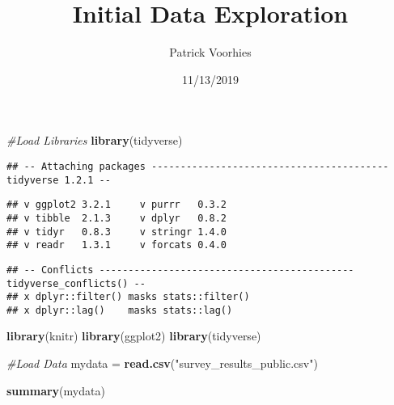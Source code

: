 \documentclass[]{article}
\title{Initial Data Exploration}
\author{Patrick Voorhies}
\date{11/13/2019}
\newenvironment{Shaded}{\begin{snugshade}}{\end{snugshade}}
\newcommand{\CommentTok}[1]{\textcolor[rgb]{0.56,0.35,0.01}{\textit{#1}}}
\newcommand{\KeywordTok}[1]{\textcolor[rgb]{0.13,0.29,0.53}{\textbf{#1}}}
\newcommand{\NormalTok}[1]{#1}
\newcommand{\StringTok}[1]{\textcolor[rgb]{0.31,0.60,0.02}{#1}}
\begin{document}
\maketitle

\begin{Shaded}
\begin{Highlighting}[]
\CommentTok{#Load Libraries}
\KeywordTok{library}\NormalTok{(tidyverse)}
\end{Highlighting}
\end{Shaded}

\begin{verbatim}
## -- Attaching packages ----------------------------------------- tidyverse 1.2.1 --
\end{verbatim}

\begin{verbatim}
## v ggplot2 3.2.1     v purrr   0.3.2
## v tibble  2.1.3     v dplyr   0.8.2
## v tidyr   0.8.3     v stringr 1.4.0
## v readr   1.3.1     v forcats 0.4.0
\end{verbatim}

\begin{verbatim}
## -- Conflicts -------------------------------------------- tidyverse_conflicts() --
## x dplyr::filter() masks stats::filter()
## x dplyr::lag()    masks stats::lag()
\end{verbatim}

\begin{Shaded}
\begin{Highlighting}[]
\KeywordTok{library}\NormalTok{(knitr)}
\KeywordTok{library}\NormalTok{(ggplot2)}
\KeywordTok{library}\NormalTok{(tidyverse)}

\CommentTok{#Load Data}
\NormalTok{mydata =}\StringTok{ }\KeywordTok{read.csv}\NormalTok{(}\StringTok{"survey_results_public.csv"}\NormalTok{)}
\end{Highlighting}
\end{Shaded}

\begin{Shaded}
\begin{Highlighting}[]
\KeywordTok{summary}\NormalTok{(mydata)}
\end{Highlighting}
\end{Shaded}
\end{document}
